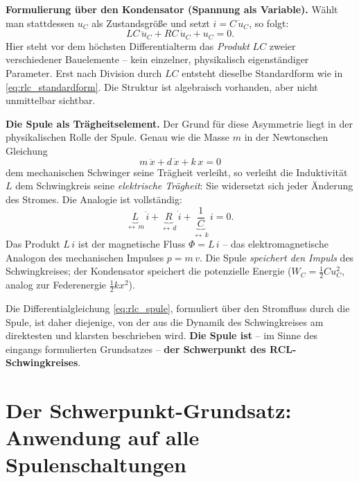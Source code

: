﻿\documentclass[12pt, a4paper]{article}
\begin{document}
	\textbf{Formulierung über den Kondensator (Spannung als Variable).}
	Wählt man stattdessen $u_C$ als Zustandsgröße und setzt $i = C\,\dot{u}_C$, so folgt:
	\begin{equation}
		LC\,\ddot{u}_C + RC\,\dot{u}_C + u_C = 0.
		\label{eq:rlc_kondensator}
	\end{equation}
	Hier steht vor dem höchsten Differentialterm das \textit{Produkt} $LC$ zweier verschiedener Bauelemente -- kein einzelner, physikalisch eigenständiger Parameter. Erst nach Division durch $LC$ entsteht dieselbe Standardform wie in \eqref{eq:rlc_standardform}. Die Struktur ist algebraisch vorhanden, aber nicht unmittelbar sichtbar.

	\textbf{Die Spule als Trägheitselement.}
	Der Grund für diese Asymmetrie liegt in der physikalischen Rolle der Spule. Genau wie die Masse $m$ in der Newtonschen Gleichung
	\begin{equation}
		m\,\ddot{x} + d\,\dot{x} + k\,x = 0
	\end{equation}
	dem mechanischen Schwinger seine Trägheit verleiht, so verleiht die Induktivität $L$ dem Schwingkreis seine \textit{elektrische Trägheit}: Sie widersetzt sich jeder Änderung des Stromes. Die Analogie ist vollständig:
	\begin{equation}
		\underbrace{L}_{\displaystyle\leftrightarrow\, m}\,\ddot{i}
		+ \underbrace{R}_{\displaystyle\leftrightarrow\, d}\,\dot{i}
		+ \underbrace{\frac{1}{C}}_{\displaystyle\leftrightarrow\, k}\,i = 0.
	\end{equation}
	Das Produkt $L\,i$ ist der magnetische Fluss $\Phi = L\,i$ -- das elektromagnetische Analogon des mechanischen Impulses $p = m\,v$. Die Spule \textit{speichert den Impuls} des Schwingkreises; der Kondensator speichert die potenzielle Energie ($W_C = \frac{1}{2}Cu_C^2$, analog zur Federenergie $\frac{1}{2}kx^2$).

	Die Differentialgleichung \eqref{eq:rlc_spule}, formuliert über den Stromfluss durch die Spule, ist daher diejenige, von der aus die Dynamik des Schwingkreises am direktesten und klarsten beschrieben wird. \textbf{Die Spule ist} -- im Sinne des eingangs formulierten Grundsatzes -- \textbf{der Schwerpunkt des RCL-Schwingkreises}.
	
	
	\section{Der Schwerpunkt-Grundsatz: Anwendung auf alle Spulenschaltungen}
	\label{sec:schwerpunkt_spule_allgemein}
	
\end{document}
